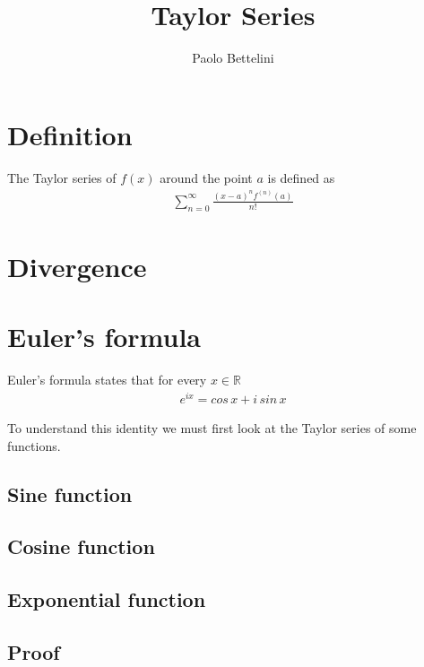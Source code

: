 \documentclass{article}
\title{Taylor Series}
\author{Paolo Bettelini}
\date{}
\begin{document}
\maketitle
\tableofcontents
\pagebreak

\section{Definition}
The Taylor series of \(f(x)\) around the point \(a\) is defined as
\begin{align*}
    \sum_{n=0}^{\infty}\frac{(x-a)^nf^{(n)}(a)}{n!}
\end{align*}

\pagebreak

\section{Divergence}

\pagebreak

\section{Euler's formula}

Euler's formula states that for every \(x\in\mathbb{R}\)
\begin{align*}
    e^{ix}=cos\,x+i\,sin\,x
\end{align*}

To understand this identity we must first look at the Taylor series of some functions.

\subsection{Sine function}
\subsection{Cosine function}
\subsection{Exponential function}

\pagebreak

\subsection{Proof}
\end{document}
